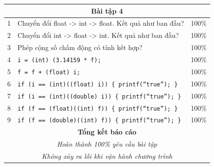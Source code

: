 \documentclass[a4paper,12pt]{report}
\begin{document}
\begin{center}
\begin{tabular}{|c|p{}|c|}
		\multicolumn{3}{|c|}{\textbf{Bài tập 4}}                                                                                                                                     \\\hline
		1            & Chuyển đổi float -> int -> float. Kết quả như ban đầu?                                                                                     & 100\%            \\\hline
		2            & Chuyển đổi int -> float -> int. Kết quả như ban đầu?                                                                                       & 100\%            \\\hline
		3            & Phép cộng số chấm động có tính kết hợp?                                                                                                    & 100\%            \\\hline
		4            & \verb|i = (int) (3.14159 * f);|                                                                                                            & 100\%            \\\hline
		5            & \verb|f = f + (float) i;|                                                                                                                  & 100\%            \\\hline
		6            & \verb|if (i == (int)((float) i)) { printf(“true”); }|                                                                                      & 100\%            \\\hline
		7            & \verb|if (i == (int)((double) i)) { printf(“true”); }|                                                                                     & 100\%            \\\hline
		8            & \verb|if (f == (float)((int) f)) { printf(“true”); }|                                                                                      & 100\%            \\\hline
		9            & \verb|if (f == (double)((int) f)) { printf(“true”); }|                                                                                     & 100\%            \\\hline
		\multicolumn{3}{|c|}{\textbf{Tổng kết báo cáo}}                                                                                                                              \\
		\multicolumn{3}{|c|}{\textsl{Hoàn thành 100\% yêu cầu bài tập}}                                                                                                              \\
		\multicolumn{3}{|c|}{\textsl{Không xảy ra lỗi khi vận hành chương trình}}                                                                                                    \\\hline
	\end{tabular}
\end{center}
\end{document}
